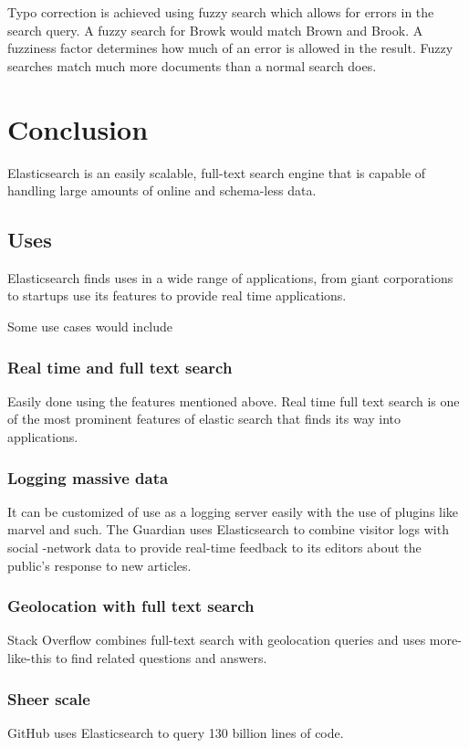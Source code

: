 \documentclass[12pt]{article}
\begin{document}
				Typo correction is achieved using fuzzy search which allows for errors in the search query. A fuzzy search for Browk would match Brown and Brook. A fuzziness factor determines how much of an error is allowed in the result. Fuzzy searches match much more documents than a normal search does. 

	\section{Conclusion}
		Elasticsearch is an easily scalable, full-text search engine that  is  capable  of  handling  large  amounts  of  online  and schema-less  data.

		\subsection{Uses}
			Elasticsearch finds uses in a wide range of applications, from giant corporations to startups use its features to provide real time applications.

			Some use cases would include
			\subsubsection{Real time and full text search}
				Easily done using the features mentioned above. Real time full text search is one of the most prominent features of elastic search that finds its way into applications.

			\subsubsection{Logging massive data}
				It can be customized of use as a logging server easily with the use of plugins like marvel and such. The Guardian uses Elasticsearch to combine visitor logs with social -network data to provide real-time feedback to its editors about the public’s response to new articles.

			\subsubsection{Geolocation with full text search}
				Stack Overflow combines full-text search with geolocation queries and uses more-like-this to find related questions and answers.

			\subsubsection{Sheer scale}
				GitHub uses Elasticsearch to query 130 billion lines of code.
\end{document}
